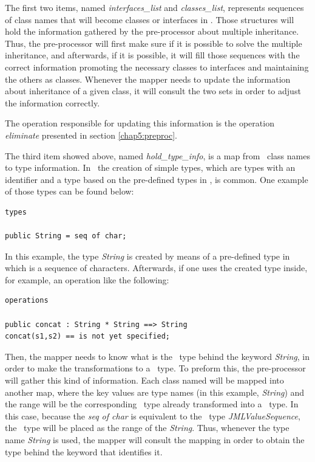 The first two items, named \textit{interfaces\_list} and \textit{classes\_list}, represents sequences of class names that will become classes or interfaces in \jml. Those structures will hold the information gathered by the pre-processor about multiple inheritance. Thus, the pre-processor will first make sure if it is possible to solve the multiple inheritance, and afterwards, if it is possible, it will fill those sequences with the correct information promoting the necessary classes to interfaces and maintaining the others as classes. Whenever the mapper needs to update the information about inheritance of a given class, it will consult the two sets in order to adjust the information correctly. 

The operation responsible for updating this information is the operation \textit{eliminate} presented in section \ref{chap5:preproc}.

The third item showed above, named \textit{hold\_type\_info}, is a map from \vpp\ class names to type information. In \vpp\ the creation of simple types, which are types with an identifier and a type based on the pre-defined types in \vpp, is common. One example of those types can be found below:
\lstset{style=mystyle}
\bigskip
\begin{lstlisting}
types

public String = seq of char;
\end{lstlisting}
\bigskip
In this example, the type \textit{String} is created by means of a pre-defined type in \vpp which is a sequence of characters. Afterwards, if one uses the created type inside, for example, an operation like the following:
\bigskip
\begin{lstlisting}
operations

public concat : String * String ==> String
concat(s1,s2) == is not yet specified;
\end{lstlisting}
\bigskip
Then, the mapper needs to know what is the \vpp\ type behind the keyword \textit{String}, in order to make the transformations to a \jml\ type. To preform this, the pre-processor will gather this kind of information. Each class named will be mapped into another map, where the key values are type names (in this example, \textit{String}) and the range will be the corresponding \vpp\ type already transformed into a \jml\ type. In this case, because the \textit{seq of char} is equivalent to the \jml\ type \textit{JMLValueSequence}, the \jml\ type will be placed as the range of the \textit{String}. Thus, whenever the type name \textit{String} is used, the mapper will consult the mapping in order to obtain the type behind the keyword that identifies it.

